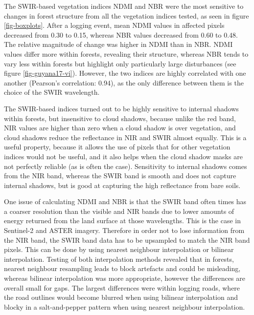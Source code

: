 \documentclass[a4paper,12pt]{scrbook}
\begin{document}
The \ac{SWIR}-based vegetation indices \ac{NDMI} and \ac{NBR} were the most sensitive to changes in forest structure from all the vegetation indices tested, as seen in figure \ref{fig-boxplots}. After a logging event, mean \ac{NDMI} values in affected pixels decreased from 0.30 to 0.15, whereas \ac{NBR} values decreased from 0.60 to 0.48. The relative magnitude of change was higher in \ac{NDMI} than in \ac{NBR}. \ac{NDMI} values differ more within forests, revealing their structure, whereas \ac{NBR} tends to vary less within forests but highlight only particularly large disturbances (see figure \ref{fig-guyana17-vi}). However, the two indices are highly correlated with one another (Pearson's correlation: 0.94), as the only difference between them is the choice of the \ac{SWIR} wavelength.

The \ac{SWIR}-based indices turned out to be highly sensitive to internal shadows within forests, but insensitive to cloud shadows, because unlike the red band, \ac{NIR} values are higher than zero when a cloud shadow is over vegetation, and cloud shadows reduce the reflectance in \ac{NIR} and \ac{SWIR} almost equally. This is a useful property, because it allows the use of pixels that for other vegetation indices would not be useful, and it also helps when the cloud shadow masks are not perfectly reliable (as is often the case). Sensitivity to internal shadows comes from the \ac{NIR} band, whereas the \ac{SWIR} band is smooth and does not capture internal shadows, but is good at capturing the high reflectance from bare soils.

One issue of calculating \ac{NDMI} and \ac{NBR} is that the \ac{SWIR} band often times has a coarser resolution than the visible and \ac{NIR} bands due to lower amounts of energy returned from the land surface at those wavelengths. This is the case in Sentinel-2 and \ac{ASTER} imagery. Therefore in order not to lose information from the \ac{NIR} band, the \ac{SWIR} band data has to be upsampled to match the \ac{NIR} band pixels. This can be done by using nearest neighbour interpolation or bilinear interpolation. Testing of both interpolation methods revealed that in forests, nearest neighbour resampling leads to block artefacts and could be misleading, whereas bilinear interpolation was more appropriate, however the differences are overall small for gaps. The largest differences were within logging roads, where the road outlines would become blurred when using bilinear interpolation and blocky in a salt-and-pepper pattern when using nearest neighbour interpolation.
\end{document}
